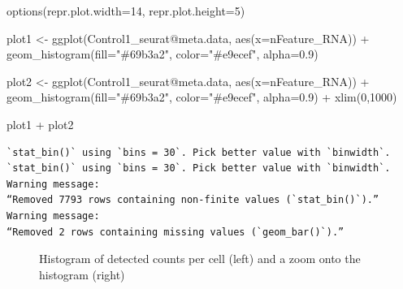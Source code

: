\documentclass[
  letterpaper,
  DIV=11,
  numbers=noendperiod]{scrartcl}
\newenvironment{Shaded}{\begin{snugshade}}{\end{snugshade}}
\newcommand{\AttributeTok}[1]{\textcolor[rgb]{0.40,0.45,0.13}{#1}}
\newcommand{\DecValTok}[1]{\textcolor[rgb]{0.68,0.00,0.00}{#1}}
\newcommand{\FloatTok}[1]{\textcolor[rgb]{0.68,0.00,0.00}{#1}}
\newcommand{\FunctionTok}[1]{\textcolor[rgb]{0.28,0.35,0.67}{#1}}
\newcommand{\NormalTok}[1]{\textcolor[rgb]{0.00,0.23,0.31}{#1}}
\newcommand{\OtherTok}[1]{\textcolor[rgb]{0.00,0.23,0.31}{#1}}
\newcommand{\SpecialCharTok}[1]{\textcolor[rgb]{0.37,0.37,0.37}{#1}}
\newcommand{\StringTok}[1]{\textcolor[rgb]{0.13,0.47,0.30}{#1}}
\begin{document}
\begin{Shaded}
\begin{Highlighting}[]
\FunctionTok{options}\NormalTok{(}\AttributeTok{repr.plot.width=}\DecValTok{14}\NormalTok{, }\AttributeTok{repr.plot.height=}\DecValTok{5}\NormalTok{)}

\NormalTok{plot1 }\OtherTok{\textless{}{-}} \FunctionTok{ggplot}\NormalTok{(Control1\_seurat}\SpecialCharTok{@}\NormalTok{meta.data, }\FunctionTok{aes}\NormalTok{(}\AttributeTok{x=}\NormalTok{nFeature\_RNA)) }\SpecialCharTok{+} 
     \FunctionTok{geom\_histogram}\NormalTok{(}\AttributeTok{fill=}\StringTok{"\#69b3a2"}\NormalTok{, }\AttributeTok{color=}\StringTok{"\#e9ecef"}\NormalTok{, }\AttributeTok{alpha=}\FloatTok{0.9}\NormalTok{)}

\NormalTok{plot2 }\OtherTok{\textless{}{-}} \FunctionTok{ggplot}\NormalTok{(Control1\_seurat}\SpecialCharTok{@}\NormalTok{meta.data, }\FunctionTok{aes}\NormalTok{(}\AttributeTok{x=}\NormalTok{nFeature\_RNA)) }\SpecialCharTok{+} 
     \FunctionTok{geom\_histogram}\NormalTok{(}\AttributeTok{fill=}\StringTok{"\#69b3a2"}\NormalTok{, }\AttributeTok{color=}\StringTok{"\#e9ecef"}\NormalTok{, }\AttributeTok{alpha=}\FloatTok{0.9}\NormalTok{) }\SpecialCharTok{+}
     \FunctionTok{xlim}\NormalTok{(}\DecValTok{0}\NormalTok{,}\DecValTok{1000}\NormalTok{)}


\NormalTok{plot1 }\SpecialCharTok{+}\NormalTok{ plot2}
\end{Highlighting}
\end{Shaded}

\begin{verbatim}
`stat_bin()` using `bins = 30`. Pick better value with `binwidth`.
`stat_bin()` using `bins = 30`. Pick better value with `binwidth`.
Warning message:
“Removed 7793 rows containing non-finite values (`stat_bin()`).”
Warning message:
“Removed 2 rows containing missing values (`geom_bar()`).”
\end{verbatim}

\begin{figure}[H]


\caption{\label{fig-genecounts}Histogram of detected counts per cell
(left) and a zoom onto the histogram (right)}

\end{figure}%
\end{document}
